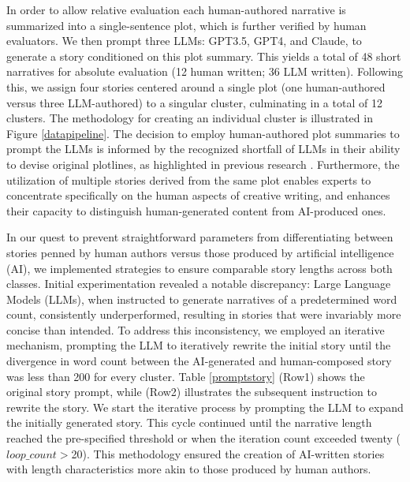 In order to allow relative evaluation each human-authored narrative is summarized into a single-sentence plot, which is further verified by human evaluators. We then prompt three LLMs: GPT3.5, GPT4, and Claude, to generate a story conditioned on this plot summary. This yields a total of 48 short narratives for absolute evaluation (12 human written; 36 LLM written). Following this, we assign four stories centered around a single plot (one human-authored versus three LLM-authored) to a singular cluster, culminating in a total of 12 clusters. The methodology for creating an individual cluster is illustrated in Figure \ref{datapipeline}. The decision to employ human-authored plot summaries to prompt the LLMs is informed by the recognized shortfall of LLMs in their ability to devise original plotlines, as highlighted in previous research \cite{ippolito2022creative}. Furthermore, the utilization of multiple stories derived from the same plot enables experts to concentrate specifically on the human aspects of creative writing, and enhances their capacity to distinguish human-generated content from AI-produced ones.

In our quest to prevent straightforward parameters from differentiating between stories penned by human authors versus those produced by artificial intelligence (AI), we implemented strategies to ensure comparable story lengths across both classes. Initial experimentation revealed a notable discrepancy: Large Language Models (LLMs), when instructed to generate narratives of a predetermined word count, consistently underperformed, resulting in stories that were invariably more concise than intended. To address this inconsistency, we employed an iterative mechanism, prompting the LLM to iteratively rewrite the initial story until the divergence in word count between the AI-generated and human-composed story was less than 200 for every cluster. Table \ref{promptstory} (Row1) shows the original story prompt, while (Row2) illustrates the subsequent instruction to rewrite the story. We start the iterative process by prompting the LLM to expand the initially generated story. This cycle continued until the narrative length reached the pre-specified threshold or when the iteration count exceeded twenty ($loop\_count > $20). This methodology ensured the creation of AI-written stories with length characteristics more akin to those produced by human authors.

